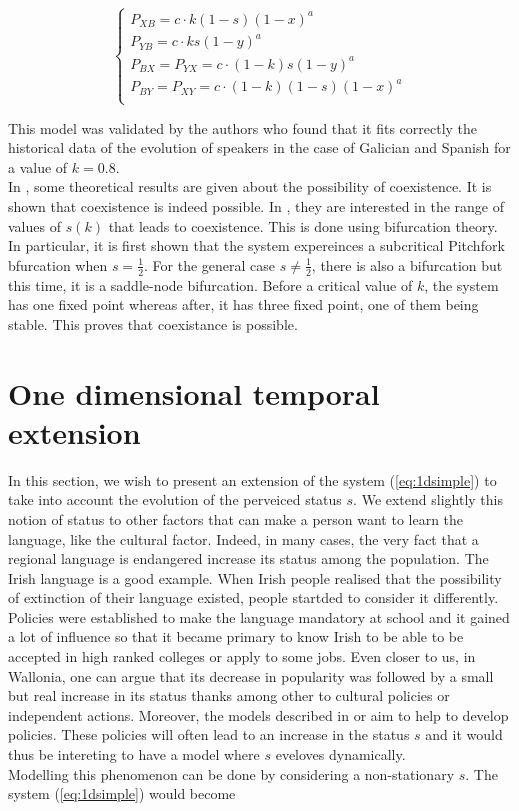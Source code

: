 \documentclass{article}
\begin{document}
\[
\begin{cases}
P_{XB} = c \cdot k (1-s) (1-x)^a \\
P_{YB} = c \cdot k s (1-y)^a \\
P_{BX} = P_{YX} = c \cdot (1-k) s (1-y)^a \\
P_{BY} = P_{XY} = c \cdot (1-k) (1-s) (1-x)^a \\
\end{cases}
\]

This model was validated by the authors who found that it fits correctly the historical data of the evolution of speakers in the case of Galician and Spanish for a value of $k = 0.8$. \\
In \cite{BAGGS19939}, some theoretical results are given about the possibility of coexistence. It is shown that coexistence is indeed possible. In \cite{bilingual}, they are interested in the range of values of $s(k)$ that leads to coexistence. This is done using bifurcation theory. In particular, it is first shown that the system expereinces a subcritical Pitchfork bfurcation when $s = \frac{1}{2}$. For the general case $s \ne \frac{1}{2}$, there is also a bifurcation but this time, it is a saddle-node bifurcation. Before a critical value of $k$, the system has one fixed point whereas after, it has three fixed point, one of them being stable. This proves that coexistance is possible.

\section{One dimensional temporal extension}
\label{sec:1d}
In this section, we wish to present an extension of the system (\ref{eq:1dsimple}) to take into account the evolution of the perveiced status $s$.
We extend slightly this notion of status to other factors that can make a person want to learn the language, like the cultural factor.
Indeed, in many cases, the very fact that a regional language is endangered increase its status among the population.
The Irish language is a good example.
When Irish people realised that the possibility of extinction of their language existed, people startded to consider it differently.
Policies were established to make the language mandatory at school and it gained a lot of influence so that it became primary to know Irish to be able to be accepted in high ranked colleges or apply to some jobs.
Even closer to us, in Wallonia, one can argue that its decrease in popularity was followed by a small but real increase in its status thanks among other to cultural policies or independent actions.
Moreover, the models described in \cite{death} or \cite{bilingual} aim to help to develop policies.
These policies will often lead to an increase in the status $s$ and it would thus be intereting to have a model where $s$ eveloves dynamically. \\
Modelling this phenomenon can be done by considering a non-stationary $s$. The system (\ref{eq:1dsimple}) would become
\end{document}
